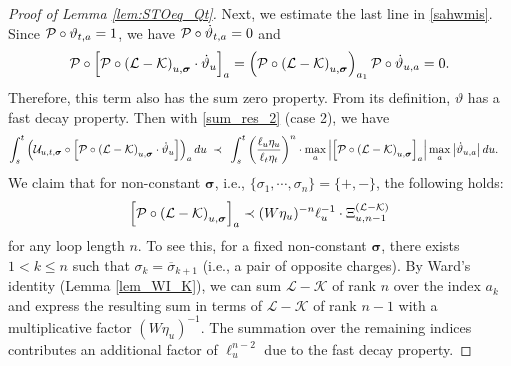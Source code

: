 \documentclass[10pt,reqno]{article}
\theoremstyle{plain} %
\theoremstyle{remark}
\numberwithin{equation}{section}
\begin{document}
\begin{proof}[Proof of Lemma \ref{lem:STOeq_Qt}]
Next, we estimate the last line in \eqref{sahwmis}. Since ${\cal P}  \circ \vartheta_{t,  \textbf{a}}=1$, we have ${\cal P}   \circ \dot  \vartheta_{t,  \textbf{a}}=0$ and 
$$
 {\cal P}  \circ \left[ {\cal P} \circ
      \left(\mathcal{L} - \mathcal{K}\right)_{u, \boldsymbol{\sigma}}
        \cdot \dot \vartheta_{u } \right]_{\textbf{a}}
        =\left({\cal P} \circ
      \left(\mathcal{L} - \mathcal{K}\right)_{u, \boldsymbol{\sigma}}\right)_{a_1} {\cal P}  \circ \dot \vartheta_{u,  \textbf{a}}=0.
$$
 Therefore, this term also has the sum zero property. From its  definition,  $\vartheta$ has a fast decay property. Then with \eqref{sum_res_2} (case 2), we have 
\begin{align}\label{jfasiuu}
 \int_{s}^t 
     \left(\mathcal{U}_{u, t, \boldsymbol{\sigma}} 
     \circ \left[ {\cal P} \circ
      \left(\mathcal{L} - \mathcal{K}\right)_{u, \boldsymbol{\sigma}}
        \cdot \dot \vartheta_{u } \right]\right)_{\textbf{a}} du  
         \;   \prec \;&\;\int_s^t \left(\frac{\ell_u\eta_u}{\ell_t\eta_t}\right)^{n}\cdot 
          \max_{a} \left|\left[{\cal P} \circ
      \left(\mathcal{L} - \mathcal{K}\right)_{u, \boldsymbol{\sigma}}\right]_a\right|
      \max_{\textbf{a}}\left| 
          \dot \vartheta_{u,\textbf{a} } \right|du .
\end{align}
We claim that for non-constant $\boldsymbol{\sigma}$, i.e., $\{\sigma_1, \cdots, \sigma_n\} = \{+, -\}$, the following holds:  
\begin{align}\label{jywiiwsoks}
    \left[{\cal P} \circ
    \left(\mathcal{L} - \mathcal{K}\right)_{u, \boldsymbol{\sigma}}\right]_a \prec (W\eta_u)^{-n} \ell_u^{-1} \cdot \Xi^{(\mathcal{L}-\mathcal{K})}_{u, n-1}
\end{align}
for any loop length $n$.   To see this, for a fixed non-constant $\boldsymbol{\sigma}$, there exists $1 < k \leq n$ such that $\sigma_k = \overline{\sigma}_{k+1}$ (i.e., a pair of opposite charges). By Ward's identity (Lemma \ref{lem_WI_K}), we can sum $\mathcal{L} - \mathcal{K}$ of rank $n$ over the index $a_k$ and express the resulting sum in terms of $\mathcal{L} - \mathcal{K}$ of rank $n-1$ with a multiplicative factor $(W \eta_u)^{-1}$. The summation over the remaining indices contributes an additional factor of $\ell_u^{n-2}$ due to the fast decay property.



\end{proof}
\end{document}
